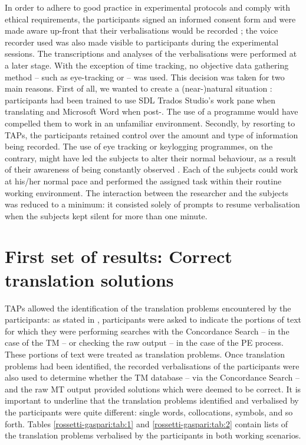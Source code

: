 \documentclass[output=paper]{LSP/langsci}
\begin{document}
\newpage
In order to adhere to good practice in experimental protocols and comply with ethical requirements, the participants signed an informed consent form and were made aware up-front that their verbalisations would be recorded \citep{OBrien2010a}; the voice recorder used was also made visible to participants during the experimental sessions. The transcriptions and analyses of the verbalisations were performed at a later stage. With the exception of time tracking, no objective data gathering method -- such as eye-tracking or  -- was used. This decision was taken for two main reasons. First of all, we wanted to create a \mbox{(near-)natural} situation \citep{Li2004}: participants had been trained to use SDL Trados Studio's work pane when translating and Microsoft Word when post-. The use of a  programme would have compelled them to work in an unfamiliar environment. Secondly, by resorting to TAPs, the participants retained control over the amount and type of information being recorded. The use of eye tracking or keylogging programmes, on the contrary, might have led the subjects to alter their normal behaviour, as a result of their awareness of being constantly observed \citep{Hansen2008}. Each of the subjects could work at his/her normal pace and performed the assigned task within their routine working environment. The interaction between the researcher and the subjects was reduced to a minimum: it consisted solely of prompts to resume verbalisation when the subjects kept silent for more than one minute.

\section{First set of results: Correct translation solutions}\label{ressetti-gaspari:sec:4}

TAPs allowed the identification of the translation problems encountered by the participants: as stated in , participants were asked to indicate the portions of text for which they were performing searches with the Concordance Search -- in the case of the TM -- or checking the raw output -- in the case of the PE process. These portions of text were treated as translation problems. Once translation problems had been identified, the recorded verbalisations of the participants were also used to determine whether the TM database -- via the Concordance Search -- and the raw MT output provided solutions which were deemed to be correct. It is important to underline that the translation problems identified and verbalised by the participants were quite different: single words, collocations, symbols, and so forth. Tables \ref{rossetti-gaspari:tab:1} and \ref{rossetti-gaspari:tab:2} contain lists of the translation problems verbalised by the participants in both working scenarios.
\end{document}
